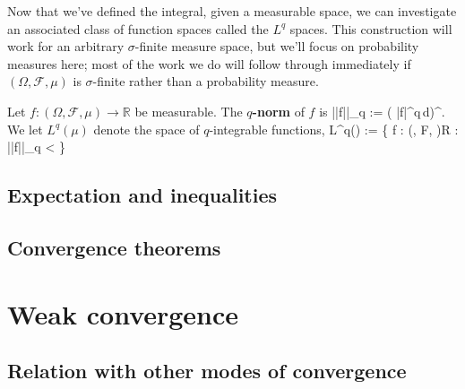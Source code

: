 Now that we've defined the integral, given a measurable space, we can investigate an associated class of function spaces called the $L^q$ spaces. This construction will work for an arbitrary $\sigma$-finite measure space, but we'll focus on probability measures here; most of the work we do will follow through immediately if $(\Omega, \mathcal F, \mu)$ is $\sigma$-finite rather than a probability measure. 

\begin{definition}
	Let $f : (\Omega, \mathcal F, \mu)\rightarrow \mathbb R$ be measurable. The \textbf{$q$-norm} of $f$ is
	\eq
		||f||_q := \left( \int |f|^q\,d\mu \right)^{}.
	\qe
	We let $L^q(\mu)$ denote the space of $q$-integrable functions, 
	\eq
		L^q(\mu) := \left\{ f : (\Omega, \mathcal F, \mu)\rightarrow \mathbb R : ||f||_q < \infty \right\} 
	\qe
\end{definition}

\subsection{Expectation and inequalities}

\subsection{Convergence theorems}

\section{Weak convergence}

\subsection{Relation with other modes of convergence}


